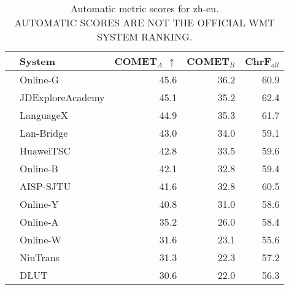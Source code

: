 \begin{table}
\centering
\caption{Automatic metric scores for zh-en. \\AUTOMATIC SCORES ARE NOT THE OFFICIAL WMT SYSTEM RANKING.}
\begin{tabular}{llrrr}
\toprule
          &            System &  COMET$_{A}$ $\uparrow$ &  COMET$_{B}$ &  ChrF$_{all}$ \\
\midrule
 \Uncon{} &          Online-G &                    45.6 &         36.2 &          60.9 \\
 \Const{} &  JDExploreAcademy &                    45.1 &         35.2 &          62.4 \\
 \Uncon{} &         LanguageX &                    44.9 &         35.3 &          61.7 \\
 \Uncon{} &        Lan-Bridge &                    43.0 &         34.0 &          59.1 \\
 \Uncon{} &         HuaweiTSC &                    42.8 &         33.5 &          59.6 \\
 \Uncon{} &          Online-B &                    42.1 &         32.8 &          59.4 \\
 \Const{} &         AISP-SJTU &                    41.6 &         32.8 &          60.5 \\
 \Uncon{} &          Online-Y &                    40.8 &         31.0 &          58.6 \\
 \Uncon{} &          Online-A &                    35.2 &         26.0 &          58.4 \\
 \Uncon{} &          Online-W &                    31.6 &         23.1 &          55.6 \\
 \Const{} &          NiuTrans &                    31.3 &         22.3 &          57.2 \\
 \Const{} &              DLUT &                    30.6 &         22.0 &          56.3 \\
\bottomrule
\end{tabular}
\end{table}



